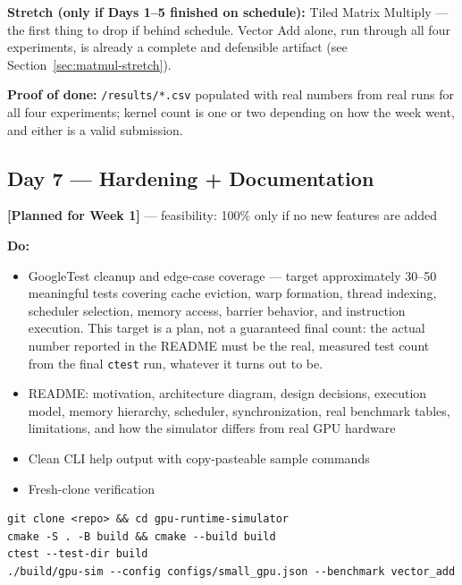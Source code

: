 \documentclass[11pt]{article}
\newcommand{\statuslabel}[1]{\textbf{\textcolor{steel}{[#1]}}}
\begin{document}
\begin{center}
\end{center}

\textbf{Stretch (only if Days 1--5 finished on schedule):} Tiled Matrix
Multiply --- the first thing to drop if behind schedule. Vector Add alone,
run through all four experiments, is already a complete and defensible
artifact (see Section~\ref{sec:matmul-stretch}).

\textbf{Proof of done:} \texttt{/results/*.csv} populated with real numbers
from real runs for all four experiments; kernel count is one or two
depending on how the week went, and either is a valid submission.

\subsection{Day 7 --- Hardening + Documentation}
\label{sec:day7}
\statuslabel{Planned for Week 1} --- feasibility: 100\% only if no new
features are added

\textbf{Do:}
\begin{itemize}[leftmargin=1.2cm]
  \item GoogleTest cleanup and edge-case coverage --- target
  approximately 30--50 meaningful tests covering cache eviction, warp
  formation, thread indexing, scheduler selection, memory access, barrier
  behavior, and instruction execution. This target is a plan, not a
  guaranteed final count: the actual number reported in the README must be
  the real, measured test count from the final \texttt{ctest} run, whatever
  it turns out to be.
  \item README: motivation, architecture diagram, design decisions,
  execution model, memory hierarchy, scheduler, synchronization, real
  benchmark tables, limitations, and how the simulator differs from real
  GPU hardware
  \item Clean CLI help output with copy-pasteable sample commands
  \item Fresh-clone verification
\end{itemize}

\begin{lstlisting}
git clone <repo> && cd gpu-runtime-simulator
cmake -S . -B build && cmake --build build
ctest --test-dir build
./build/gpu-sim --config configs/small_gpu.json --benchmark vector_add
\end{lstlisting}
\end{document}
